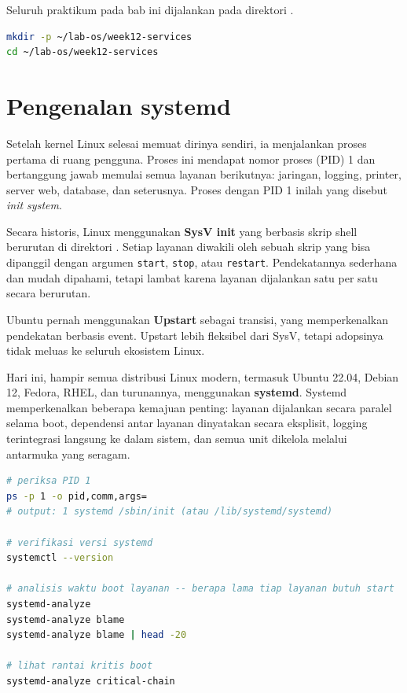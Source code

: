 \begin{notebox}
Seluruh praktikum pada bab ini dijalankan pada direktori .
\begin{lstlisting}[language=bash]
mkdir -p ~/lab-os/week12-services
cd ~/lab-os/week12-services
\end{lstlisting}
\end{notebox}

\section{Pengenalan systemd}
\label{sec:init-system}

Setelah kernel Linux selesai memuat dirinya sendiri, ia menjalankan proses pertama di ruang pengguna. Proses ini mendapat nomor proses (PID) 1 dan bertanggung jawab memulai semua layanan berikutnya: jaringan, logging, printer, server web, database, dan seterusnya. Proses dengan PID 1 inilah yang disebut \textit{init system}.

Secara historis, Linux menggunakan \textbf{SysV init} yang berbasis skrip shell berurutan di direktori . Setiap layanan diwakili oleh sebuah skrip yang bisa dipanggil dengan argumen \texttt{start}, \texttt{stop}, atau \texttt{restart}. Pendekatannya sederhana dan mudah dipahami, tetapi lambat karena layanan dijalankan satu per satu secara berurutan.

Ubuntu pernah menggunakan \textbf{Upstart} sebagai transisi, yang memperkenalkan pendekatan berbasis event. Upstart lebih fleksibel dari SysV, tetapi adopsinya tidak meluas ke seluruh ekosistem Linux.

Hari ini, hampir semua distribusi Linux modern, termasuk Ubuntu 22.04, Debian 12, Fedora, RHEL, dan turunannya, menggunakan \textbf{systemd}. Systemd memperkenalkan beberapa kemajuan penting: layanan dijalankan secara paralel selama boot, dependensi antar layanan dinyatakan secara eksplisit, logging terintegrasi langsung ke dalam sistem, dan semua unit dikelola melalui antarmuka yang seragam.

\begin{lstlisting}[language=bash, caption={Verifikasi init system dan analisis waktu boot}]
# periksa PID 1
ps -p 1 -o pid,comm,args=
# output: 1 systemd /sbin/init (atau /lib/systemd/systemd)

# verifikasi versi systemd
systemctl --version

# analisis waktu boot layanan -- berapa lama tiap layanan butuh start
systemd-analyze
systemd-analyze blame
systemd-analyze blame | head -20

# lihat rantai kritis boot
systemd-analyze critical-chain
\end{lstlisting}


